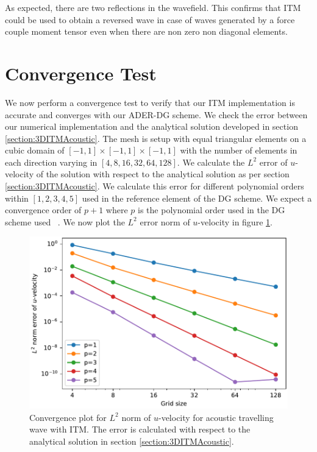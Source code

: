 As expected, there are two reflections in the wavefield. This confirms that \ac{ITM} could be used to obtain a reversed wave in case of waves generated by a force couple moment tensor even when there are non zero non diagonal elements.
\section{Convergence Test}\label{sec:convergence}
We now perform a convergence test to verify that our \ac{ITM} implementation is accurate and converges with our \ac{ADER}-\ac{DG} scheme. 
We check the error between our numerical implementation and the analytical solution developed in section \ref{section:3DITMAcoustic}. 
The mesh is setup with equal triangular elements on a cubic domain of $\left[-1, 1\right] \times \left[-1, 1\right] \times \left[-1, 1\right]$ with the number of elements in each direction varying in $\left[4, 8, 16, 32, 64, 128\right]$.
We calculate the $L^2$ error of $u$-velocity of the solution with respect to the analytical solution as per section \ref{section:3DITMAcoustic}. We calculate this error for different polynomial
orders within $\left[1, 2, 3, 4, 5\right]$ used in the reference element of the \ac{DG} scheme. We expect a convergence order of $p+1$ where $p$ is the polynomial order used in the
\ac{DG} scheme used ~\parencite{cockburn2011discontinuous}. We now plot the $L^2$ error norm of $u$-velocity in figure \ref{fig:convergence}.

\begin{figure}[!htpb]
    \centering
    \includegraphics[width=0.8\linewidth]{figures/error1.pdf}
    \caption{Convergence plot for $L^2$ norm of $u$-velocity for acoustic travelling wave with \ac{ITM}. The error is calculated with respect to the analytical solution
    in section \ref{section:3DITMAcoustic}.}
    \label{fig:convergence}
\end{figure}

